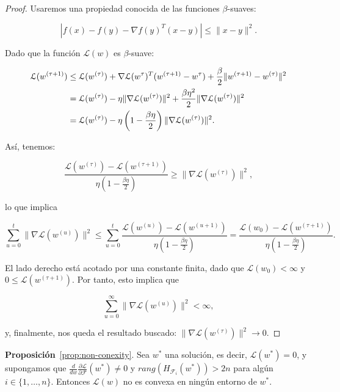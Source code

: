 \begin{proof}
  Usaremos una propiedad conocida de las funciones $\beta$-suaves:

  \[
      | f(x) - f(y) - \nabla f(y)^{T} (x-y) | \leq \| x - y \|^2.
  \]  

  Dado que la función $\mathcal{L}(w)$ es $\beta$-suave:

  \begin{align}
      \mathcal{L} (w^{(\tau + 1)}) &\leq \mathcal{L} (w^{(\tau)}) + \nabla \mathcal{L} (w^{\tau})^{T} (w^{(\tau + 1)} - w^{\tau}) + \frac{\beta}{2} \|w^{(\tau + 1)} - w^{(\tau)}\|^2 \notag \\
      &= \mathcal{L} (w^{(\tau)}) - \eta \|\nabla \mathcal{L} (w^{(\tau)})\|^2 + \frac{\beta \eta^2}{2} \|\nabla \mathcal{L} (w^{(\tau)})\|^2 \notag \\
      &= \mathcal{L} (w^{(\tau)}) - \eta \left( 1 - \frac{\beta \eta}{2} \right) \|\nabla \mathcal{L} (w^{(\tau)})\|^2.
  \end{align}

  Así, tenemos:

  \[
      \frac{\mathcal{L} (w^{(\tau)}) - \mathcal{L} (w^{(\tau + 1)})}{\eta \left( 1 - \frac{\beta \eta}{2} \right)} \geq \|\nabla \mathcal{L} (w^{(\tau)})\|^2,
  \]

  lo que implica

  \[
      \sum_{u=0}^{t} \|\nabla \mathcal{L} (w^{(u)})\|^2 \leq \sum_{u=0}^{t} \frac{\mathcal{L} (w^{(u)}) - \mathcal{L} (w^{(u+1)})}{\eta \left( 1 - \frac{\beta \eta}{2} \right)} = \frac{\mathcal{L} (w_0) - \mathcal{L} (w^{(\tau + 1)})}{\eta \left( 1 - \frac{\beta \eta}{2} \right)}.
  \]

  El lado derecho está acotado por una constante finita, dado que $\mathcal{L} (w_0) < \infty$ y $0 \leq \mathcal{L} (w^{(\tau + 1)})$. Por tanto, esto implica que

  \[
      \sum_{u=0}^{\infty} \|\nabla \mathcal{L} (w^{(u)})\|^2 < \infty,
  \]

  y, finalmente, nos queda el resultado buscado: $\|\nabla \mathcal{L} (w^{(\tau)})\|^2 \to 0$.
\end{proof}

\textbf{Proposición}~\ref{prop:non-conexity}. Sea $w^{*}$ una solución, es decir, $\mathcal{L}(w^{*}) = 0$, y supongamos que $\frac{d}{dw}\frac{\partial \mathcal{L}}{\partial \mathcal{F}}(w^{*}) \neq 0$ y $rang(H_{\mathcal{F}_{i}}(w^{*})) > 2n$ para algún $i \in \{1, \ldots, n \}$. Entonces $\mathcal{L}(w)$ no es convexa en ningún entorno de $w^{*}$.

